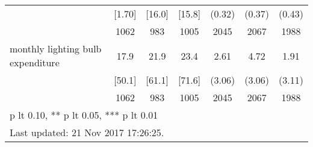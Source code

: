\begin{table}[htbp]
\begin{tabular*}{1\hsize}{@{\hskip\tabcolsep\extracolsep\fill}l*{1}{cccccc}}
                                &   [1.70]&   [16.0]&   [15.8]&   (0.32)         &   (0.37)         &   (0.43)         \\
                                &     1062&      983&     1005&     2045         &     2067         &     1988         \\
monthly lighting bulb expenditure&     17.9&     21.9&     23.4&     2.61         &     4.72         &     1.91         \\
                                &   [50.1]&   [61.1]&   [71.6]&   (3.06)         &   (3.06)         &   (3.11)         \\
                                &     1062&      983&     1005&     2045         &     2067         &     1988         \\
\bottomrule
\multicolumn{7}{l}{\footnotesize * p lt 0.10, ** p lt 0.05, *** p lt 0.01}\\
\multicolumn{7}{l}{\footnotesize Last updated: 21 Nov 2017 17:26:25.}\\
\end{tabular*}
\end{table}
